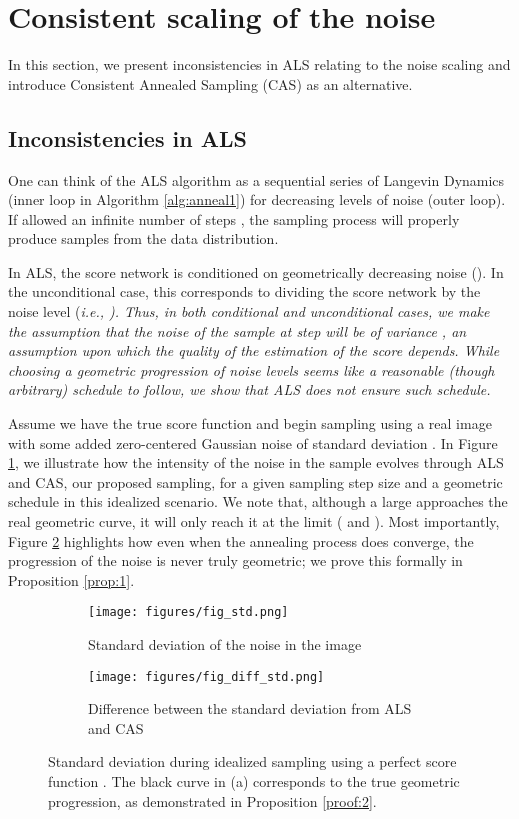 \documentclass{article} \usepackage{iclr2021_conference_notitle,times}
\theoremstyle{definition}
\theoremstyle{definition}
\begin{document}
\section{Consistent scaling of the noise}\label{sec:consistent}

In this section, we present inconsistencies in ALS relating to the noise scaling and introduce Consistent Annealed Sampling (CAS) as an alternative.


\subsection{Inconsistencies in ALS}

One can think of the ALS algorithm as a sequential series of Langevin Dynamics (inner loop in Algorithm \ref{alg:anneal1}) for decreasing levels of noise (outer loop). If allowed an infinite number of steps , the sampling process will properly produce samples from the data distribution. 

In ALS, the score network is conditioned on geometrically decreasing noise (). In the unconditional case, this corresponds to dividing the score network by the noise level (\em i.e., \em ). Thus, in both conditional and unconditional cases, we make the assumption that the noise of the sample at step  will be of variance , an assumption upon which the quality of the estimation of the score depends. 
While choosing a geometric progression of noise levels seems like a reasonable (though arbitrary) schedule to follow, we show that ALS does not ensure such schedule.

Assume we have the true score function  and begin sampling using a real image with some added zero-centered Gaussian noise of standard deviation . In Figure \ref{fig_std}, we illustrate how the intensity of the noise in the sample evolves through ALS and CAS, our proposed sampling, for a given sampling step size  and a geometric schedule  in this idealized scenario. We note that, although a large  approaches the real geometric curve, it will only reach it at the limit ( and ). 
Most importantly, Figure \ref{fig_diff_std} highlights how even when the annealing process does converge, the progression of the noise is never truly geometric; we prove this formally in Proposition \ref{prop:1}.

\begin{figure}[ht!] 
\captionsetup[subfigure]{justification=centering}
    \centering
    \begin{subfigure}[t]{0.465\linewidth}
\texttt{[image: figures/fig\_std.png]}
    \caption{Standard deviation of the noise in the image} 
    \label{fig_std} 
  \end{subfigure}
  \begin{subfigure}[t]{0.47\linewidth}
    \texttt{[image: figures/fig\_diff\_std.png]}
    \caption{Difference between the standard deviation from ALS and CAS } 
    \label{fig_diff_std} 
  \end{subfigure} 
  \caption{Standard deviation during idealized sampling using a perfect score function . The black curve in (a) corresponds to the true geometric progression, as demonstrated in Proposition \ref{proof:2}.}
  \label{fig:std} 
\end{figure}
\end{document}
